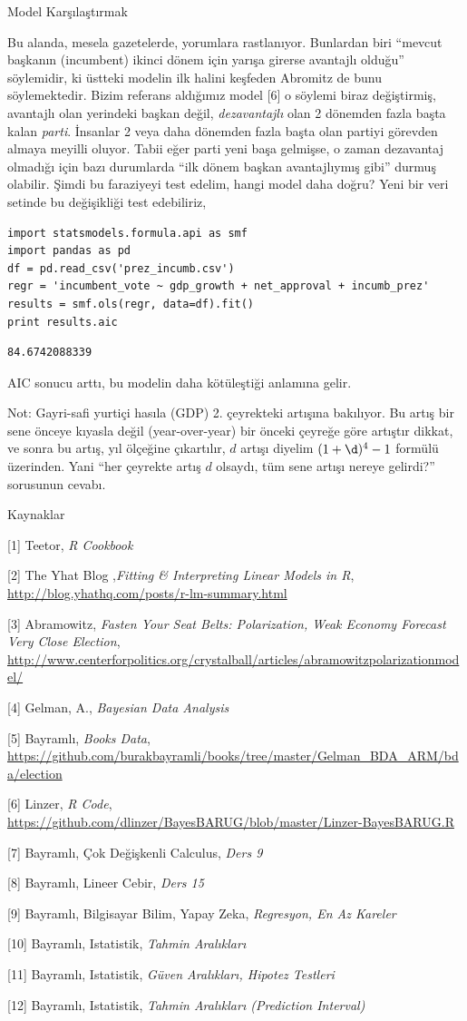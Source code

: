 \documentclass[12pt,fleqn]{article}\usepackage{../../common}
\begin{document}
Model Karşılaştırmak

Bu alanda, mesela gazetelerde, yorumlara rastlanıyor. Bunlardan biri ``mevcut
başkanın (incumbent) ikinci dönem için yarışa girerse avantajlı olduğu''
söylemidir, ki üstteki modelin ilk halini keşfeden Abromitz de bunu
söylemektedir. Bizim referans aldığımız model [6] o söylemi biraz değiştirmiş,
avantajlı olan yerindeki başkan değil, {\em dezavantajlı} olan 2 dönemden fazla
başta kalan {\em parti}. İnsanlar 2 veya daha dönemden fazla başta olan partiyi
görevden almaya meyilli oluyor. Tabii eğer parti yeni başa gelmişse, o zaman
dezavantaj olmadığı için bazı durumlarda ``ilk dönem başkan avantajlıymış gibi''
durmuş olabilir. Şimdi bu faraziyeyi test edelim, hangi model daha doğru?  Yeni
bir veri setinde bu değişikliği test edebiliriz,

\begin{verbatim} 
import statsmodels.formula.api as smf
import pandas as pd
df = pd.read_csv('prez_incumb.csv')
regr = 'incumbent_vote ~ gdp_growth + net_approval + incumb_prez'
results = smf.ols(regr, data=df).fit()
print results.aic
\end{verbatim}

\begin{verbatim}
84.6742088339
\end{verbatim}

AIC sonucu arttı, bu modelin daha kötüleştiği anlamına gelir. 

Not: Gayri-safi yurtiçi hasıla (GDP) 2. çeyrekteki artışına bakılıyor. Bu
artış bir sene önceye kıyasla değil (year-over-year) bir önceki çeyreğe
göre artıştır dikkat, ve sonra bu artış, yıl ölçeğine çıkartılır, $d$
artışı diyelim $(1+\d)^4 - 1$ formülü üzerinden. Yani ``her çeyrekte artış
$d$ olsaydı, tüm sene artışı nereye gelirdi?'' sorusunun cevabı.

Kaynaklar

[1] Teetor, {\em R Cookbook}

[2] The Yhat Blog ,{\em Fitting \& Interpreting Linear Models in R}, \url{http://blog.yhathq.com/posts/r-lm-summary.html}

[3] Abramowitz, {\em Fasten Your Seat Belts: Polarization, Weak Economy Forecast
Very Close Election}, \url{http://www.centerforpolitics.org/crystalball/articles/abramowitzpolarizationmodel/}

[4] Gelman, A., {\em Bayesian Data Analysis}

[5] Bayramlı, {\em Books Data}, \url{https://github.com/burakbayramli/books/tree/master/Gelman_BDA_ARM/bda/election}

[6] Linzer, {\em R Code}, \url{https://github.com/dlinzer/BayesBARUG/blob/master/Linzer-BayesBARUG.R}

[7] Bayramlı, Çok Değişkenli Calculus, {\em Ders 9}

[8] Bayramlı, Lineer Cebir, {\em Ders 15}

[9] Bayramlı, Bilgisayar Bilim, Yapay Zeka, {\em Regresyon, En Az Kareler}

[10] Bayramlı, Istatistik, {\em Tahmin Aralıkları}

[11] Bayramlı, Istatistik, {\em Güven Aralıkları, Hipotez Testleri}

[12] Bayramlı, Istatistik, {\em Tahmin Aralıkları (Prediction Interval)}
\end{document}
